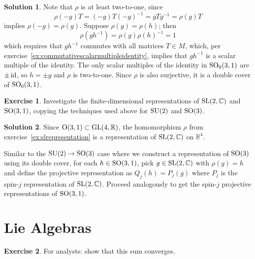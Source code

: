 \documentclass[11pt, a4paper]{report}
\theoremstyle{definition}
\newtheorem{exercise}{Exercise}[part]
\newtheorem{solution}{Solution}[part]
\newenvironment{ex}{\begin{exercise}}{\end{exercise}\pagebreak[1]}
\newenvironment{sol}{\begin{solution}}{\end{solution}\pagebreak[3]}
\newcommand*{\GL}{\ensuremath\text{GL}}
\newcommand*{\SL}{\ensuremath\text{SL}}
\renewcommand*{\O}{\ensuremath\text{O}}
\newcommand*{\SO}{\ensuremath\text{SO}}
\newcommand*{\SU}{\ensuremath\text{SU}}
\newcommand*{\op}[1]{\ensuremath\mathop{}\mathopen{}#1}
\newcommand*{\id}{\op{\mathrm{id}}}
\begin{document}
\begin{sol}

Note that $\rho$ is at least two-to-one, since
\[
    \rho(-g)T = (-g) T {(-g)}^{-1} = gTg^{-1} = \rho(g) T
\]
implies $\rho(-g) = \rho(g)$. Suppose $\rho(g) = \rho(h)$; then
\[
    \rho(gh^{-1}) = \rho(g) {\rho(h)}^{-1} = 1
\]
which requires that $gh^{-1}$ commutes with all matrices $T \in M$, which, per exercise~\ref{ex:commutativescalarmultipleidentity}, implies that $gh^{-1}$ is a scalar multiple of the identity.
The only scalar multiples of the identity in $\SO_0(3, 1)$ are $\pm \id$, so $h = \pm g$ and $\rho$ is two-to-one.
Since $\rho$ is also surjective, it is a double cover of $\SO_0(3, 1)$.

\end{sol}

\begin{ex}

Investigate the finite-dimensional representations of $\SL(2, \mathbb{C})$ and $\SO(3, 1)$, copying the techniques used above for $\SU(2)$ and $\SO(3)$.

\end{ex}

\begin{sol}

Since $\O(3, 1) \subset \GL(4, \mathbb{R})$, the homomorphism $\rho$ from exercise~\ref{ex:slrepresentation} is a representation of $\SL(2, \mathbb{C})$ on $\mathbb{R}^4$.

Similar to the $\SU(2) \to \SO(3)$ case where we construct a representation of $\SO(3)$ using its double cover, for each $h \in \SO(3, 1)$, pick $g \in \SL(2, \mathbb{C})$ with $\rho(g) = h$ and define the projective representation as $Q_j(h) = P_j(g)$ where $P_j$ is the spin-$j$ representation of $\SL(2, \mathbb{C})$.
Proceed analogously to get the spin-$j$ projective representations of $\SO(3, 1)$.

\end{sol}

\section{Lie Algebras}

\begin{ex}

For analysts: show that this sum converges.

\end{ex}
\end{document}
